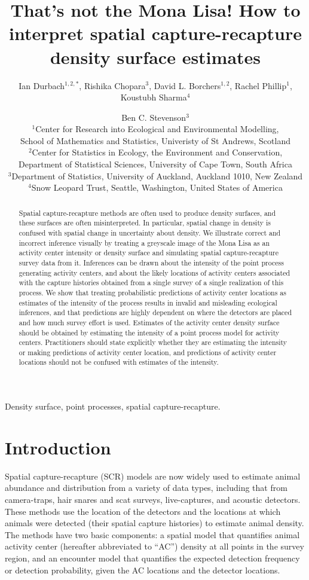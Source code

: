\documentclass[useAMS,usenatbib,referee]{biom}
\title[How to interpret SCR density surface estimates]{That's not the Mona Lisa! How to interpret spatial capture-recapture density surface estimates}
\author{Ian Durbach$^{1,2,*}$, Rishika Chopara$^{3}$, David L. Borchers$^{1,2}$, Rachel Phillip$^{1}$, Koustubh Sharma$^{4}$ \and Ben C. Stevenson$^{3}$ \\
$^{1}$Center for Research into Ecological and Environmental Modelling, \\ School of Mathematics and Statistics, Univeristy of St Andrews, Scotland \\
$^{2}$Center for Statistics in Ecology, the Environment and Conservation, \\ Department of Statistical Sciences, University of Cape Town, South Africa \\
$^{3}$Department of Statistics, University of Auckland, Auckland 1010, New Zealand \\
$^{4}$Snow Leopard Trust, Seattle, Washington, United States of America \\
\email{indurbach@gmail.com}}
\begin{document}
\begin{abstract}
Spatial capture-recapture methods are often used to produce density surfaces, and these surfaces are often misinterpreted. In particular, spatial change in density is confused with spatial change in uncertainty about density. We illustrate correct and incorrect inference visually by treating a greyscale image of the Mona Lisa as an activity center intensity or density surface and simulating spatial capture-recapture survey data from it. Inferences can be drawn about the intensity of the point process generating activity centers, and about the likely locations of activity centers associated with the capture histories obtained from a single survey of a single realization of this process. We show that treating probabilistic predictions of activity center locations as estimates of the intensity of the process results in invalid and misleading ecological inferences, and that predictions are highly dependent on where the detectors are placed and how much survey effort is used. Estimates of the activity center density surface should be obtained by estimating the intensity of a point process model for activity centers. Practitioners should state explicitly whether they are estimating the intensity or making predictions of activity center location, and predictions of activity center locations should not be confused with estimates of the intensity.
\end{abstract}


\begin{keywords}
Density surface, point processes, spatial capture-recapture.
\end{keywords}

\maketitle 

\section{Introduction}

Spatial capture-recapture (SCR) models \citep*{Efford:04,Borchers+Efford:08, Royle+Young:08} are now widely used to estimate animal abundance and distribution from a variety of data types, including that from camera-traps, hair snares and scat surveys, live-captures, and acoustic detectors. These methods use the location of the detectors and the locations at which animals were detected (their spatial capture histories) to estimate animal density. The methods have two basic components: a spatial model that quantifies animal activity center (hereafter abbreviated to ``AC'') density at all points in the survey region, and an encounter model that quantifies the expected detection frequency or detection probability, given the AC locations and the detector locations. 
\end{document}
